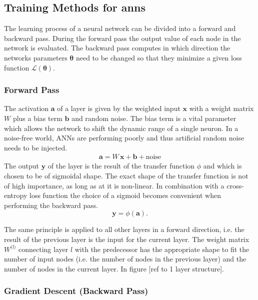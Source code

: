 \subsection{Training Methods for \glspl{ann}}
\label{trainingANN}

The learning process of a neural network can be divided into a forward and backward pass. During the forward pass the output value of each node in the network is evaluated. The backward pass computes in which direction the networks parameters $\mathbf{\theta}$ need to be changed so that they minimize a given loss function $\mathcal{L}(\mathbf{\theta})$.

\subsubsection{Forward Pass}
The activation $\mathbf{a}$ of a layer is given by the weighted input $\mathbf{x}$ with a weight matrix $W$ plus a bias term $\mathbf{b}$ and random noise. The bias term is a vital parameter which allows the network to shift the dynamic range of a single neuron. In a noise-free world, ANNs are performing poorly and thus artificial random noise needs to be injected. 
\begin{align}
\label{activation}
\mathbf{a} = W \, \mathbf{x} + \mathbf{b} + \text{noise}
\end{align}
The output $\mathbf{y}$ of the layer is the result of the transfer function $\phi$ and which is chosen to be of sigmoidal shape. The exact shape of the transfer function is not of high importance, as long as at it is non-linear. In combination with a cross-entropy loss function the choice of a sigmoid becomes convenient when performing the backward pass.
\begin{equation}
\mathbf{y} = \phi(\mathbf{a}).
\end{equation}

The same principle is applied to all other layers in a forward direction, i.e. the result of the previous layer is the input for the current layer. The weight matrix $W^{\text{(l)}}$ connecting layer $l$ with the predecessor has the appropriate shape to fit the number of input nodes (i.e. the number of nodes in the previous layer) and the number of nodes in the current layer. In figure [ref to 1 layer structure].

\subsubsection{Gradient Descent (Backward Pass)}


